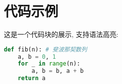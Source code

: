 \section{代码示例}

这是一个代码块的展示, 支持语法高亮:

\begin{lstlisting}[language=Python, caption={Python 代码示例}]
def fib(n): # 斐波那契数列
    a, b = 0, 1
    for _ in range(n):
        a, b = b, a + b
    return a
\end{lstlisting}
